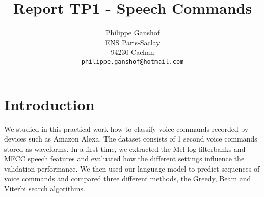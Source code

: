 \documentclass[9pt,twocolumn,letterpaper]{article}
\begin{document}
\title{Report TP1 -  Speech Commands}

\author{Philippe Ganshof\\
ENS Paris-Saclay\\
94230 Cachan\\
{\tt\small philippe.ganshof@hotmail.com}
}

\maketitle






\section{Introduction}
We studied in this practical work how to classify voice commands recorded by devices such as Amazon Alexa. The dataset consists of 1 second voice commands stored as waveforms. In a first time, we extracted the Mel-log filterbanks and MFCC speech features and evaluated how the different settings influence the validation performance. We then used our language model to predict sequences of voice commands and compared three different methods, the Greedy, Beam and Viterbi search algorithms.
\end{document}
